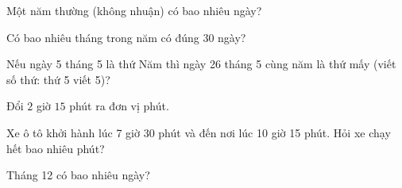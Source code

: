\begin{ex} %
Một năm thường (không nhuận) có bao nhiêu ngày?
\end{ex}

\begin{ex} %
Có bao nhiêu tháng trong năm có đúng 30 ngày?
\end{ex}

\begin{ex} %
Nếu ngày 5 tháng 5 là thứ Năm thì ngày 26 tháng 5 cùng năm là thứ mấy (viết số thứ: thứ 5 viết 5)?
\end{ex}

\begin{ex} %
Đổi $2$ giờ $15$ phút ra đơn vị phút.
\end{ex}

\begin{ex} %
Xe ô tô khởi hành lúc 7 giờ 30 phút và đến nơi lúc 10 giờ 15 phút. Hỏi xe chạy hết bao nhiêu phút?
\end{ex}

\begin{ex} %
Tháng 12 có bao nhiêu ngày?
\end{ex}
